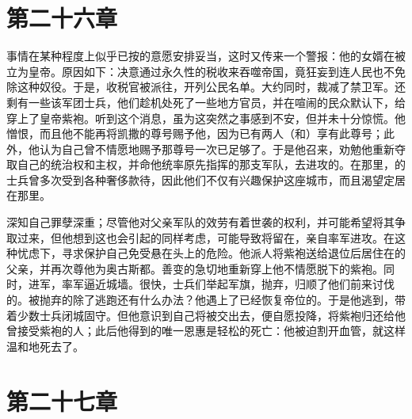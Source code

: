
\section{第二十六章}

事情在某种程度上似乎已按的意愿安排妥当，这时又传来一个警报：他的女婿在被立为皇帝。原因如下：决意通过永久性的税收来吞噬帝国，竟狂妄到连人民也不免除这种奴役。于是，收税官被派往，开列公民名单。大约同时，裁减了禁卫军。还剩有一些该军团士兵，他们趁机处死了一些地方官员，并在喧闹的民众默认下，给穿上了皇帝紫袍。听到这个消息，虽为这突然之事感到不安，但并未十分惊慌。他憎恨，而且他不能再将凯撒的尊号赐予他，因为已有两人（和）享有此尊号；此外，他认为自己曾不情愿地赐予那尊号一次已足够了。于是他召来，劝勉他重新夺取自己的统治权和主权，并命他统率原先指挥的那支军队，去进攻的。在那里，的士兵曾多次受到各种奢侈款待，因此他们不仅有兴趣保护这座城市，而且渴望定居在那里。\par

深知自己罪孽深重；尽管他对父亲军队的效劳有着世袭的权利，并可能希望将其争取过来，但他想到这也会引起的同样考虑，可能导致将留在，亲自率军进攻。在这种忧虑下，寻求保护自己免受悬在头上的危险。他派人将紫袍送给退位后居住在的父亲，并再次尊他为奥古斯都。善变的急切地重新穿上他不情愿脱下的紫袍。同时，进军，率军逼近城墙。很快，士兵们举起军旗，抛弃，归顺了他们前来讨伐的。被抛弃的除了逃跑还有什么办法？他遇上了已经恢复帝位的。于是他逃到，带着少数士兵闭城固守。但他意识到自己将被交出去，便自愿投降，将紫袍归还给他曾接受紫袍的人；此后他得到的唯一恩惠是轻松的死亡：他被迫割开血管，就这样温和地死去了。\par


\section{第二十七章}


